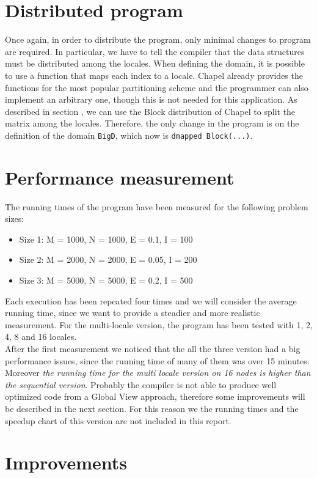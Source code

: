 \documentclass{article}
\begin{document}
\section{Distributed program}
Once again, in order to distribute the program, only minimal changes to program are required. In particular, we have to tell the compiler that the data structures must be distributed among the locales. When defining the domain, it is possible to use a function that maps each index to a locale. Chapel already provides the functions for the most popular partitioning scheme and the programmer can also implement an arbitrary one, though this is not needed for this application. As described in section , we can use the Block distribution of Chapel to split the matrix among the locales. Therefore, the only change in the program is on the definition of the domain \texttt{BigD}, which now is \texttt{dmapped Block(...)}.

\section{Performance measurement}
The running times of the program have been measured for the following problem sizes:
\begin{itemize}
    \item Size 1: M = 1000, N = 1000, E = 0.1, I = 100
    \item Size 2: M = 2000, N = 2000, E = 0.05, I = 200
    \item Size 3: M = 5000, N = 5000, E = 0.2, I = 500
\end{itemize}
Each execution has been repeated four times and we will consider the average running time, since we want to provide a steadier and more realistic measurement. For the multi-locale version, the program has been tested with 1, 2, 4, 8 and 16 locales. \\

After the first measurement we noticed that the all the three version had a big performance issues, since the running time of many of them was over 15 minutes. Moreover \emph{the running time for the multi locale version on 16 nodes is higher than the sequential version}. Probably the compiler is not able to produce well optimized code from a Global View approach, therefore some improvements will be described in the next section. For this reason we the running times and the speedup chart of this version are not included in this report.

\section{Improvements} \label{sec:improvements}
\end{document}
